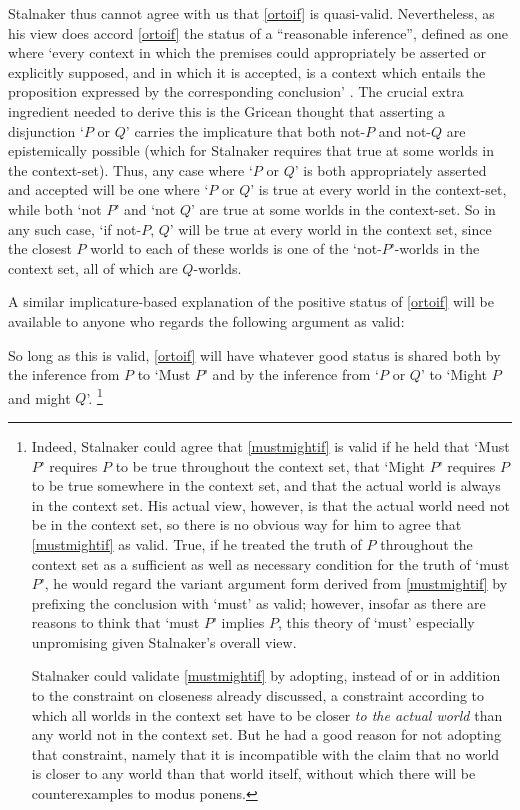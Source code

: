 \documentclass[If.tex]{subfiles}
\begin{document}
Stalnaker thus cannot agree with us that \ref{ortoif} is quasi-valid.  Nevertheless, as his view does accord \ref{ortoif} the status of a “reasonable inference”, defined as one where ‘every context in which the premises could appropriately be asserted or explicitly supposed, and in which it is accepted, is a context which entails the proposition expressed by the corresponding conclusion’ \parencite{StalnakerIC}.  The crucial extra ingredient needed to derive this is the Gricean thought that asserting a disjunction ‘$P$ or $Q$’ carries the implicature that both not-$P$ and not-$Q$ are epistemically possible (which for Stalnaker requires that true at some worlds in the context-set).  Thus, any case where ‘$P$ or $Q$’ is both appropriately asserted and accepted will be one where ‘$P$ or $Q$’ is true at every world in the context-set, while both ‘not $P$’ and ‘not $Q$’ are true at some worlds in the context-set.  So in any such case, ‘if not-$P$, $Q$’ will be true at every world in the context set, since the closest $P$ world to each of these worlds is one of the ‘not-$P$’-worlds in the context set, all of which are $Q$-worlds.  
 
A similar implicature-based explanation of the positive status of \ref{ortoif} will be available to anyone who regards the following argument as valid:
\begin{prop}
	 \label{mustmightif}
\end{prop}
So long as this is valid, \ref{ortoif} will have whatever good status is shared both by the inference from $P$ to ‘Must $P$’ and by the inference from ‘$P$ or $Q$’ to ‘Might $P$ and might $Q$’.%
\footnote{Indeed, Stalnaker could agree that \ref{mustmightif} is valid if he held that ‘Must $P$’ requires $P$ to be true throughout the context set, that ‘Might $P$’ requires $P$ to be true somewhere in the context set, and that the actual world is always in the context set.  His actual view, however, is that the actual world need not be in the context set, so there is no obvious way for him to agree that \ref{mustmightif} as valid.  True, if he treated the truth of $P$ throughout the context set as a sufficient as well as necessary condition for the truth of ‘must $P$’, he would regard the variant argument form derived from \ref{mustmightif} by prefixing the conclusion with ‘must’ as valid; however, insofar as there are reasons to think that ‘must $P$’ implies $P$, this theory of ‘must’ especially unpromising given Stalnaker's overall view.
	
	Stalnaker could validate \ref{mustmightif} by adopting, instead of or in addition to the constraint on closeness already discussed, a constraint according to which all worlds in the context set have to be closer \emph{to the actual world} than any world not in the context set.  But he had a good reason for not adopting that constraint, namely that it is incompatible with the claim that no world is closer to any world than that world itself, without which there will be counterexamples to modus ponens.} 
\end{document}
